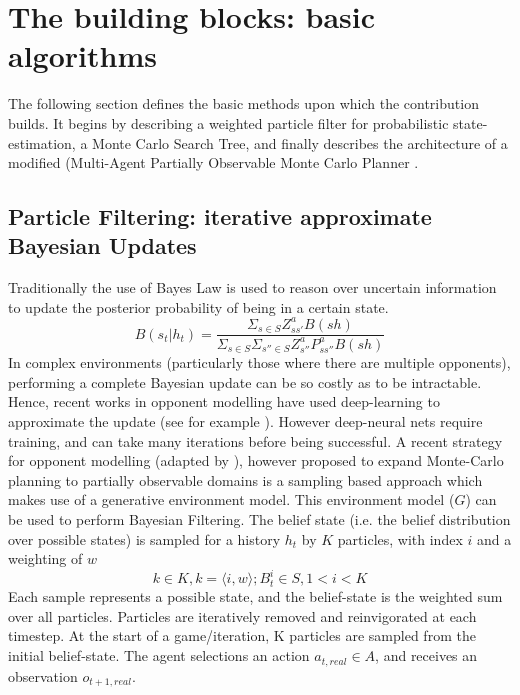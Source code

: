 
\section{The building blocks: basic algorithms}
The following section defines the basic methods upon which the contribution builds. It begins by describing a weighted particle filter for probabilistic state-estimation, a Monte Carlo Search Tree, and finally describes the architecture of a modified (Multi-Agent Partially Observable Monte Carlo Planner \cite{Hayashi_et_al2020,Silver2010}.  
\subsection{Particle Filtering: iterative approximate Bayesian Updates}\label{ParticleFiter}
Traditionally the use of Bayes Law is used to reason over uncertain information to update the posterior probability of being in a certain state.
\begin{equation}
    B(s_t|h_t) = 
     \frac{\Sigma_{s \in S} Z^{a}_{ss'}B(sh)}
    {\Sigma_{s\in S} \Sigma_{s''\in S}Z^{a}_{s''}P^{a}_{ss''}B(sh)}
\end{equation} 
In complex environments (particularly those where there are multiple opponents), performing a complete Bayesian update can be so costly as to be intractable. Hence, recent works in opponent modelling have used deep-learning to approximate the update (see for example \cite{he_om_DRL}). However deep-neural nets require training, and can take many iterations before being successful. A recent strategy for opponent modelling (adapted by \cite{Hayashi_et_al2020}), however proposed to expand Monte-Carlo planning to partially observable domains is a sampling based approach which makes use of a generative environment model. This environment model ($G$) can be used to perform Bayesian Filtering. 
\newline \newline
The belief state (i.e. the belief distribution over possible states) is sampled for a history $h_t$ by $K$ particles, with index $i$ and a weighting of $w$ 
\begin{equation}
    k \in K, k = \langle i, w \rangle; B^i_t \in S, 1 < i < K    
\end{equation}
Each sample represents a possible state, and the belief-state is the weighted sum over all particles. 
\newline \newline
Particles are iteratively removed and reinvigorated at each timestep. At the start of a game/iteration, K particles are sampled from the initial belief-state. The agent selections an action $a_{t, real} \in A$, and receives an observation $o_{t+1,real}$. 
